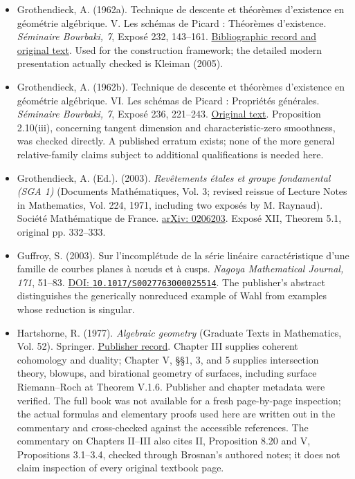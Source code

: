\begin{sloppypar}
\begin{itemize}
\item Grothendieck, A. (1962a). Technique de descente et théorèmes d'existence en géométrie algébrique. V. Les schémas de Picard : Théorèmes d'existence. \emph{Séminaire Bourbaki, 7}, Exposé 232, 143--161. \href{https://numdam.org/book-part/SB_1961-1962__7__143_0/}{Bibliographic record and original text}. Used for the construction framework; the detailed modern presentation actually checked is Kleiman (2005).

\item Grothendieck, A. (1962b). Technique de descente et théorèmes d'existence en géométrie algébrique. VI. Les schémas de Picard : Propriétés générales. \emph{Séminaire Bourbaki, 7}, Exposé 236, 221--243. \href{https://numdam.org/item/SB_1961-1962__7__221_0.pdf}{Original text}. Proposition 2.10(iii), concerning tangent dimension and characteristic-zero smoothness, was checked directly. A published erratum exists; none of the more general relative-family claims subject to additional qualifications is needed here.

\item Grothendieck, A. (Ed.). (2003). \emph{Rev\^etements \'etales et groupe fondamental (SGA 1)} (Documents Math\'ematiques, Vol. 3; revised reissue of Lecture Notes in Mathematics, Vol. 224, 1971, including two expos\'es by M. Raynaud). Soci\'et\'e Math\'ematique de France. \href{https://arxiv.org/abs/math/0206203}{arXiv: 0206203}. Expos\'e XII, Theorem 5.1, original pp. 332--333.

\item Guffroy, S. (2003). Sur l'incompl\'etude de la s\'erie lin\'eaire caract\'eristique d'une famille de courbes planes \`a n\oe uds et \`a cusps. \emph{Nagoya Mathematical Journal, 171}, 51--83. \href{https://doi.org/10.1017/S0027763000025514}{DOI: \nolinkurl{10.1017/S0027763000025514}}. The publisher's abstract distinguishes the generically nonreduced example of Wahl from examples whose reduction is singular.

\item Hartshorne, R. (1977). \emph{Algebraic geometry} (Graduate Texts in Mathematics, Vol. 52). Springer. \href{https://doi.org/10.1007/978-1-4757-3849-0}{Publisher record}. Chapter III supplies coherent cohomology and duality; Chapter V, §§1, 3, and 5 supplies intersection theory, blowups, and birational geometry of surfaces, including surface Riemann--Roch at Theorem V.1.6. Publisher and chapter metadata were verified. The full book was not available for a fresh page-by-page inspection; the actual formulas and elementary proofs used here are written out in the commentary and cross-checked against the accessible references. The commentary on Chapters II--III also cites II, Proposition 8.20 and V, Propositions 3.1--3.4, checked through Brosnan's authored notes; it does not claim inspection of every original textbook page.


\end{itemize}
\end{sloppypar}

